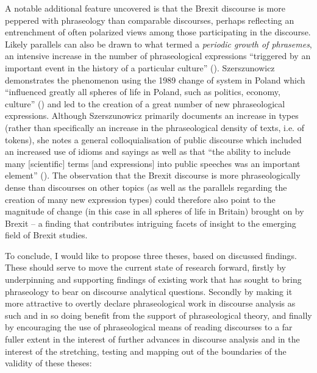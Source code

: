 \documentclass[output=paper]{langscibook}
\begin{document}
A notable additional feature uncovered is that the Brexit discourse is more peppered with phraseology than comparable discourses, perhaps reflecting an entrenchment of often polarized views among those participating in the discourse. Likely parallels can also be drawn to what \citet{Szerszunowicz2015} termed a \textit{periodic growth of phrasemes}, an intensive increase in the number of phraseological expressions ``triggered by an important event in the history of a particular culture'' (\citeyear[103]{Szerszunowicz2015}). Szerszunowicz demonstrates the phenomenon using the 1989 change of system in Poland which ``influenced greatly all spheres of life in Poland, such as politics, economy, culture'' (\citeyear[103]{Szerszunowicz2015}) and led to the creation of a great number of new phraseological expressions. Although Szerszunowicz primarily documents an increase in types (rather than specifically an increase in the phraseological density of texts, i.e. of tokens), she notes a general colloquialisation of public discourse which included an increased use of idioms and sayings as well as that ``the ability to include many [scientific] terms [and expressions] into public speeches was an important element'' (\citeyear[108]{Szerszunowicz2015}). The observation that the Brexit discourse is more phraseologically dense than discourses on other topics (as well as the parallels regarding the creation of many new expression types) could therefore also point to the magnitude of change (in this case in all spheres of life in Britain) brought on by Brexit -- a finding that contributes intriguing facets of insight to the emerging field of Brexit studies.

To conclude, I would like to propose three theses, based on discussed findings. These should serve to move the current state of research forward, firstly by underpinning and supporting findings of existing work that has sought to bring phraseology to bear on discourse analytical questions. Secondly by making it more attractive to overtly declare phraseological work in discourse analysis as such and in so doing benefit from the support of phraseological theory, and finally by encouraging the use of phraseological means of reading discourses to a far fuller extent in the interest of further advances in discourse analysis and in the interest of the stretching, testing and mapping out of the boundaries of the validity of these theses:
\end{document}
